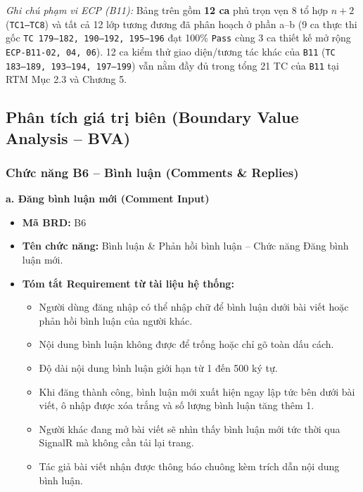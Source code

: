 \documentclass[11pt,a4paper]{article}
\begin{document}
\noindent\textit{Ghi chú phạm vi ECP (B11):} Bảng trên gồm \textbf{12 ca} phủ trọn vẹn 8 tổ hợp $n+2$ (\texttt{TC1--TC8}) và tất cả 12 lớp tương đương đã phân hoạch ở phần a--b (9 ca thực thi gốc \texttt{TC 179--182, 190--192, 195--196} đạt 100\% \texttt{Pass} cùng 3 ca thiết kế mở rộng \texttt{ECP-B11-02, 04, 06}). 12 ca kiểm thử giao diện/tương tác khác của \texttt{B11} (\texttt{TC 183--189, 193--194, 197--199}) vẫn nằm đầy đủ trong tổng 21 TC của \texttt{B11} tại RTM Mục 2.3 và Chương 5.


\subsection{Phân tích giá trị biên (Boundary Value Analysis -- BVA)}

\subsubsection{Chức năng B6 -- Bình luận (Comments \& Replies)}

\noindent\textbf{a. Đăng bình luận mới (Comment Input)}
\begin{itemize}[leftmargin=1.2cm, noitemsep]
    \item[\textbf{--}] \textbf{Mã BRD:} B6
    \item[\textbf{--}] \textbf{Tên chức năng:} Bình luận \& Phản hồi bình luận -- Chức năng Đăng bình luận mới.
    \item[\textbf{--}] \textbf{Tóm tắt Requirement từ tài liệu hệ thống:}
    \begin{itemize}[leftmargin=0.8cm, label=$\bullet$, noitemsep]
        \item Người dùng đăng nhập có thể nhập chữ để bình luận dưới bài viết hoặc phản hồi bình luận của người khác.
        \item Nội dung bình luận không được để trống hoặc chỉ gõ toàn dấu cách.
        \item Độ dài nội dung bình luận giới hạn từ 1 đến 500 ký tự.
        \item Khi đăng thành công, bình luận mới xuất hiện ngay lập tức bên dưới bài viết, ô nhập được xóa trắng và số lượng bình luận tăng thêm 1.
        \item Người khác đang mở bài viết sẽ nhìn thấy bình luận mới tức thời qua SignalR mà không cần tải lại trang.
        \item Tác giả bài viết nhận được thông báo chuông kèm trích dẫn nội dung bình luận.
    \end{itemize}
\end{itemize}
\end{document}
